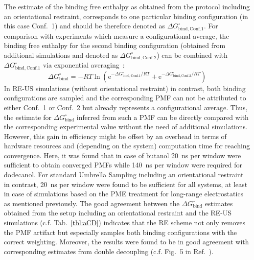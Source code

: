\documentclass[9pt,lessons]{livecoms}
\begin{document}
The estimate of the binding free enthalpy as obtained from the protocol including an orientational restraint, corresponds to one particular binding configuration (in this case Conf.~1) and should be therefore denoted as 
$\Delta G^\circ_\mathrm{bind, Conf. 1}$.
For comparison with experiments which measure a configurational average, the binding free enthalpy for the second binding configuration 
(obtained from additional simulations and denoted as $\Delta G^\circ_\mathrm{bind, Conf. 2}$) can be combined with $\Delta G^\circ_\mathrm{bind, Conf. 1}$ via exponential averaging~\cite{mobley2006use}:
\begin{equation}
\Delta G^\circ_\mathrm{bind} = -RT \ln\left(   \mathrm{e}^{-\Delta G^\circ_\mathrm{bind, Conf. 1}/RT}  +  \mathrm{e}^{-\Delta G^\circ_\mathrm{bind, Conf. 2}/RT}  \right)
\label{eq:ExpAv_1}
\end{equation}
In RE-US simulations (without orientational restraint) in contrast, both binding configurations are sampled and the corresponding 
PMF can not be attributed to either Conf.~1 or Conf.~2 but already represents a configurational average.
Thus, the estimate for $\Delta G^\circ_\mathrm{bind}$ inferred from such a PMF can be directly compared with the corresponding experimental value without the need of  additional simulations. 
However, this gain in efficiency might be offset by an overhead in terms of hardware resources and (depending on the system) computation time for reaching convergence.  
Here, it was found that in case of butanol 20~ns per window were sufficient to obtain converged PMFs while 140~ns per window were required for dodecanol.
For standard Umbrella Sampling including an orientational restraint in contrast, 20~ns per window were found to be sufficient for all systems, at least in case of simulations based on the PME treatment for 
long-range electrostatics as mentioned previously.  
The good agreement between the $\Delta G^\circ_\mathrm{bind}$ estimates obtained from the setup including an orientational restraint and the RE-US simulations (c.f. Tab.~\ref{tbl:aCD})  
indicates that the RE scheme not only removes the PMF artifact but especially samples both binding configurations with the correct weighting.
Moreover, the results were found to be in good agreement with corresponding estimates from double decoupling (c.f. Fig.~5 in Ref.~). 
\end{document}
